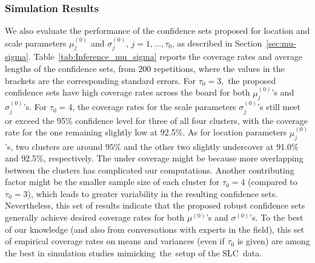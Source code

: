 \documentclass[12pt]{article}
\theoremstyle{shortspace}
\begin{document}
\subsubsection{Simulation Results}
We
also evaluate the performance of the confidence sets proposed  for location and scale parameters $\mu_j^{(0)}$ and $\sigma_j^{(0)}$, $j = 1, \ldots, \tau_0$, as described 
in Section~\ref{sec:mu-sigma}. 
Table~\ref{tab:Inference_mu_sigma} reports the coverage rates and average lengths of the confidence sets, from $200$ repetitions, 
where the values in the brackets are the corresponding standard errors.   
For $\tau_0 =3,$ the proposed confidence sets have high coverage rates across the board for both $\mu_j^{(0)}$'s and $\sigma_j^{(0)}$'s. For $\tau_0 = 4$, the coverage rates for the scale parameters $\sigma_j^{(0)}$'s still meet or exceed the 95\% confidence level 
for three of all four clusters, with the coverage rate for the one remaining slightly low at 92.5\%.  As for location parameters $\mu_j^{(0)}$'s, two  clusters are around $95\%$ and the other two slightly undercover at 91.0\% and 92.5\%, respectively. The under coverage might be because more overlapping between the clusters has complicated our computations. 
Another contributing factor might be the smaller sample size of each cluster for $\tau_0 = 4$
(compared to $\tau_0 =3$), which leads to greater variability in the resulting confidence sets.  
Nevertheless, this set of results indicate that the proposed robust confidence sets generally achieve desired coverage rates for both $\mu^{(0)}$'s and $\sigma^{(0)}$'s.
To the best of our knowledge (and also from conversations with experts in the field), this set of empirical coverage rates on means and variances (even if $\tau_0$ is given) are among the best in simulation studies mimicking~the~setup of the SLC~data. 


\begin{table}[!t]
\centering
{}
 \captionsetup{font= small}
\caption{ Simulation Results: Coverage and average width of $\mu_j^{(0)}$ and  $\sigma_j^{(0)}$, $j = 1, \ldots, \tau_0$, $\tau_0 = 3$ and $4$; SD is for standard deviation (reported in round brackets);  Repetitions is $200$. 
}
\label{tab:Inference_mu_sigma}
\end{table}
\end{document}

